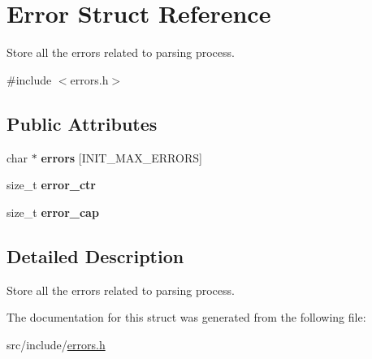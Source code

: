 \hypertarget{struct_error}{}\section{Error Struct Reference}
\label{struct_error}


Store all the errors related to parsing process.  




{\ttfamily \#include $<$errors.\+h$>$}

\subsection*{Public Attributes}
\begin{DoxyCompactItemize}
\item 
\mbox{\label{struct_error_a50d17719945d477d2830d6e67686fbc9}} 
char $\ast$ {\bfseries errors} \mbox{[}I\+N\+I\+T\+\_\+\+M\+A\+X\+\_\+\+E\+R\+R\+O\+RS\mbox{]}
\item 
\mbox{\label{struct_error_ab8e91a2a36d960644a38e9b4ad9d4713}} 
size\+\_\+t {\bfseries error\+\_\+ctr}
\item 
\mbox{\label{struct_error_a3f55d65d19ac242871f8deca9962cae2}} 
size\+\_\+t {\bfseries error\+\_\+cap}
\end{DoxyCompactItemize}


\subsection{Detailed Description}
Store all the errors related to parsing process. 

The documentation for this struct was generated from the following file\+:\begin{DoxyCompactItemize}
\item 
src/include/\mbox{\hyperlink{errors_8h}{errors.\+h}}\end{DoxyCompactItemize}

